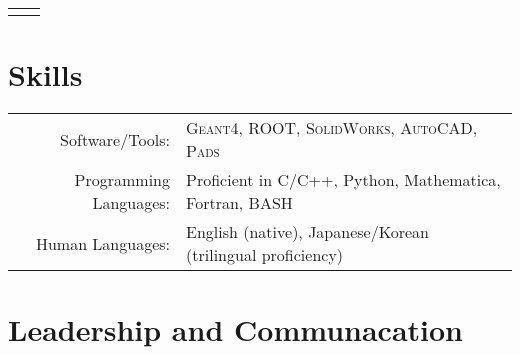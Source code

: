 \documentclass[11pt]{article} %
\begin{document}
\begin{tabularx}{\linewidth}{@{}lR@{}}
{\begin{minipage}[t]{\linewidth}
\begin{itemize}
		\end{itemize}
	\end{minipage}}\\
\end{tabularx}


\section{Skills}

\noindent\begin{tabularx}{\linewidth}{@{}rl}
	Software/Tools: & \textsc{Geant4}, \textsc{ROOT}, \textsc{SolidWorks}, \textsc{AutoCAD}, \textsc{Pads}\\
	Programming Languages: & Proficient in C/C++, Python, Mathematica, Fortran, BASH\\
	Human Languages: & English (native), Japanese/Korean (trilingual proficiency)\\
\end{tabularx}


\section{Leadership and Communacation}
\end{document}
